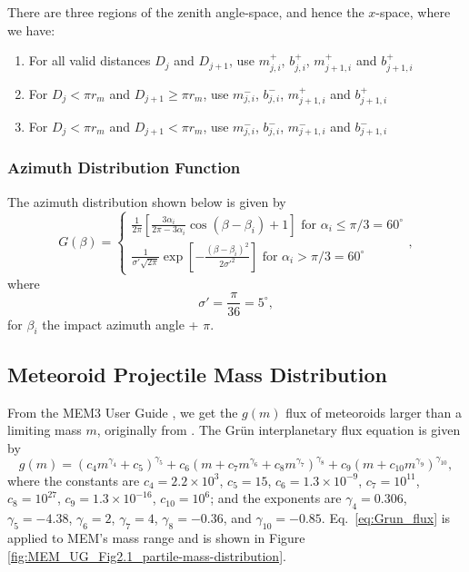 \documentclass{hitec}
\begin{document}
There are three regions of the zenith angle-space, and hence the $x$-space, where we have:
\begin{enumerate}[label=Region \Roman*:]
	\item For all valid distances $D_j$ and $D_{j+1}$, use $m_{j,i}^{+}$, $b_{j,i}^{+}$, $m_{j+1,i}^{+}$ and $b_{j+1,i}^{+}$
	\item For $D_j < \pi r_m$ and $D_{j+1} \ge \pi r_m$, use $m_{j,i}^{-}$, $b_{j,i}^{-}$, $m_{j+1,i}^{+}$ and $b_{j+1,i}^{+}$
	\item For $D_j < \pi r_m$ and $D_{j+1} < \pi r_m$, use $m_{j,i}^{-}$, $b_{j,i}^{-}$, $m_{j+1,i}^{-}$ and $b_{j+1,i}^{-}$
\end{enumerate}



\subsubsection{Azimuth Distribution Function}


The azimuth distribution shown below is given by \citep{rival1999modeling}
\begin{equation}
G(\beta) =
\begin{cases}
\frac{1}{2\pi}\left[\frac{3\alpha_i}{2\pi - 3\alpha_i}\cos(\beta-\beta_i)+1\right] \text{  for $\alpha_i\le \pi/3 = 60^\circ$}\\
\frac{1}{\sigma'\sqrt{2\pi}}\exp\left[-\frac{(\beta-\beta_i)^2}{2\sigma'^2}\right]
\text{  for $\alpha_i > \pi/3 = 60^\circ$}
\end{cases},
\end{equation}
where
\begin{equation}
\sigma' = \frac{\pi}{36} = 5^\circ, 
\end{equation}
for $\beta_i$ the impact azimuth angle + $\pi$.\\




\subsection{Meteoroid Projectile Mass Distribution}

From the MEM3 User Guide , we get the $g(m)$ flux of meteoroids larger than a limiting mass $m$, originally from \cite{grun1985collisional}. The Gr{\"u}n interplanetary flux equation is given by
\begin{equation}\label{eq:Grun_flux}
g(m) = (c_4m^{\gamma_4}+c_5)^{\gamma_5} + c_6(m + c_7m^{\gamma_6} + c_8m^{\gamma_7})^{\gamma_8} + c_9(m + c_{10}m^{\gamma_9})^{\gamma_{10}},
\end{equation}
where the constants are $c_4 = 2.2\times 10^3$, $c_5 = 15$, $c_6 = 1.3 \times 10^{-9}$, $c_7=10^{11}$, $c_8=10^{27}$, $c_9 = 1.3\times 10^{-16}$, $c_{10} = 10^6$; and the exponents are $\gamma_4 = 0.306$, $\gamma_5 = -4.38$, $\gamma_6 = 2$, $\gamma_7 = 4$, $\gamma_8 = -0.36$, and $\gamma_{10} = -0.85$. Eq.\ \ref{eq:Grun_flux} is applied to MEM's mass range and is shown in Figure \ref{fig:MEM_UG_Fig2.1_partile-mass-distribution}.
\end{document}
